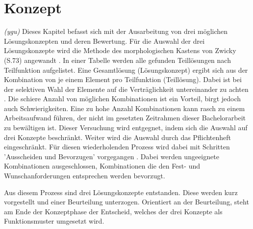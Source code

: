 \newpage
\section{Konzept}
\label{konzept}
\textit{(ygu)} Dieses Kapitel befasst sich mit der Ausarbeitung von drei möglichen Lösungskonzepten und deren Bewertung. Für die Auswahl der drei Lösungskonzepte wird die Methode des morphologischen Kastens von Zwicky (S.73) angewandt \cite{naefe}. In einer Tabelle werden alle gefunden Teillösungen nach Teilfunktion aufgelistet. Eine Gesamtlösung (Lösungskonzept) ergibt sich aus der Kombination von je einem Element pro Teilfunktion (Teillösung). Dabei ist bei der selektiven Wahl der Elemente auf die Verträglichkeit untereinander zu achten \cite{naefe}.
\newline
Die schiere Anzahl von möglichen Kombinationen ist ein Vorteil, birgt jedoch auch Schwierigkeiten. Eine zu hohe Anzahl Kombinationen kann rasch zu einem Arbeitsaufwand führen, der nicht im gesetzten Zeitrahmen dieser Bachelorarbeit zu bewältigen ist. Dieser Versuchung wird entgegnet, indem sich die Auswahl auf drei Konzepte beschränkt. Weiter wird die Auswahl durch das Pflichtenheft eingeschränkt. Für diesen wiederholenden Prozess wird dabei mit Schritten 'Ausscheiden und Bevorzugen' vorgegangen \cite{naefe}. Dabei werden ungeeignete Kombinationen ausgeschlossen, Kombinationen die den Fest- und Wunschanforderungen entsprechen werden bevorzugt.

Aus diesem Prozess sind drei Lösungskonzepte entstanden. Diese werden kurz vorgestellt und einer Beurteilung unterzogen. Orientiert an der Beurteilung, steht am Ende der Konzeptphase der Entscheid, welches der drei Konzepte als Funktionsmuster umgesetzt wird.
